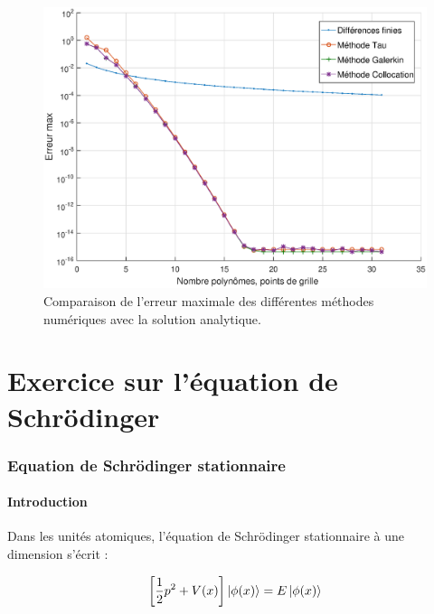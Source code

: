 \documentclass{report}
\begin{document}
\begin{figure}[h]
  \includegraphics[width=16cm]{graphe_erreur.eps}
  \caption{Comparaison de l'erreur maximale des différentes méthodes numériques avec la solution analytique.}
  \label{fig_erreur}
\end{figure}


 \part{Exercice sur l'équation de Schrödinger}
\setcounter{section}{0}
\setcounter{equation}{0}
 


\section{Equation de Schrödinger stationnaire}

\subsection{Introduction}

Dans les unités atomiques, l'équation de Schrödinger stationnaire à une dimension s'écrit :

\begin{equation}\label{eq:sta}
\left[\frac{1}{2}p^{2}+V(x)\right]\ket{\phi(x)}= E\ket{\phi(x)}
\end{equation}
\end{document}
